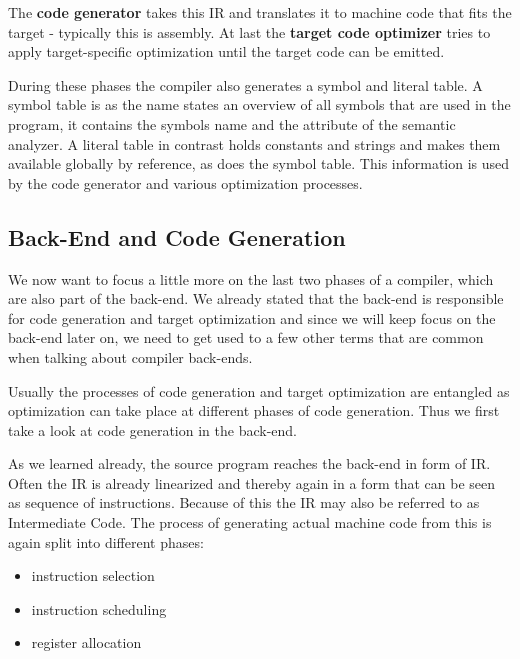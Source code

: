 The \textbf{code generator} takes this IR and translates it to machine code that fits the target - typically this is assembly.
At last the \textbf{target code optimizer} tries to apply target-specific optimization until the target code can be emitted.

During these phases the compiler also generates a symbol and literal table.
A symbol table is as the name states an overview of all symbols that are used in the program, it contains the symbols name and the attribute of the semantic analyzer.
A literal table in contrast holds constants and strings and makes them available globally by reference, as does the symbol table.
This information is used by the code generator and various optimization processes.

\subsection{Back-End and Code Generation}
We now want to focus a little more on the last two phases of a compiler, which are also part of the back-end.
We already stated that the back-end is responsible for code generation and target optimization and since we will keep focus on the back-end later on, we need to get used to a few other terms that are common when talking about compiler back-ends.

Usually the processes of code generation and target optimization are entangled as optimization can take place at different phases of code generation.
Thus we first take a look at code generation in the back-end.

As we learned already, the source program reaches the back-end in form of IR.
Often the IR is already linearized and thereby again in a form that can be seen as sequence of instructions.
Because of this the IR may also be referred to as Intermediate Code.
The process of generating actual machine code from this is again split into different phases:
\begin{itemize}
    \item instruction selection
    \item instruction scheduling
    \item register allocation
\end{itemize}


